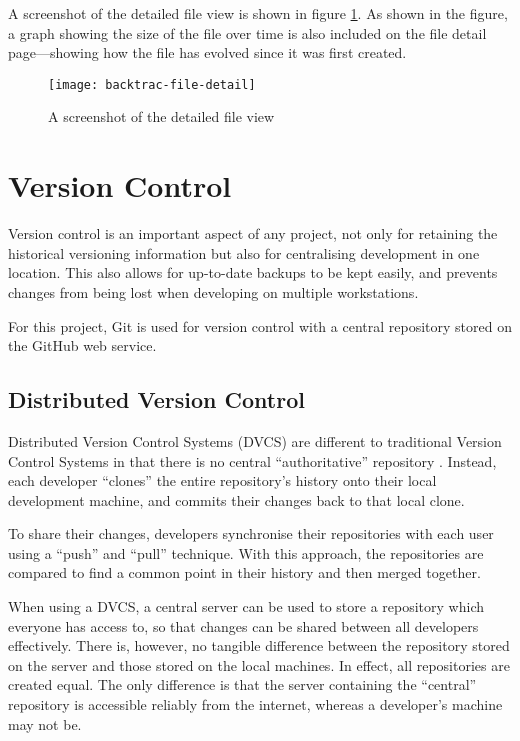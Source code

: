 A screenshot of the detailed file view is shown in figure
\ref{fig:backtrac-file-detail}. As shown in the figure, a graph showing the
size of the file over time is also included on the file detail page---showing
how the file has evolved since it was first created.

\begin{figure}[h]
    \begin{center}
        \texttt{[image: backtrac-file-detail]}
    \end{center}
    \caption{A screenshot of the detailed file view}
    \label{fig:backtrac-file-detail}
\end{figure}

\section{Version Control}
\label{sec:implementation-versioncontrol}

Version control is an important aspect of any project, not only for retaining
the historical versioning information but also for centralising development in
one location. This also allows for up-to-date backups to be kept easily, and
prevents changes from being lost when developing on multiple workstations.

For this project, Git is used for version control with a central repository
stored on the GitHub web service.

\subsection{Distributed Version Control}

Distributed Version Control Systems (DVCS) are different to traditional Version
Control Systems in that there is no central ``authoritative'' repository
\cite{robert2006}. Instead, each developer ``clones'' the entire repository's
history onto their local development machine, and commits their changes back to
that local clone.

To share their changes, developers synchronise their repositories with each
user using a ``push'' and ``pull'' technique. With this approach, the
repositories are compared to find a common point in their history and then
merged together.

When using a DVCS, a central server can be used to store a repository which
everyone has access to, so that changes can be shared between all developers
effectively. There is, however, no tangible difference between the repository
stored on the server and those stored on the local machines. In effect, all
repositories are created equal. The only difference is that the server
containing the ``central'' repository is accessible reliably from the internet,
whereas a developer's machine may not be.

